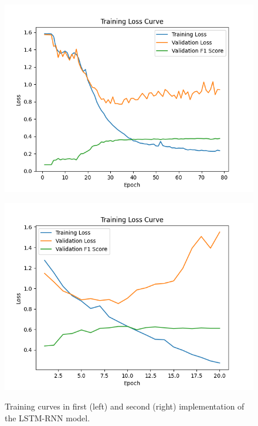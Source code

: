             \begin{figure}[H]
              \centering
              \begin{minipage}{0.48\textwidth}
                \centering
                \includegraphics[width=\textwidth]{images/loss_first.png}
                \label{fig:lstm_training_curve_initial}
              \end{minipage}\hfill
              \begin{minipage}{0.48\textwidth}
                \centering
                \includegraphics[width=\textwidth]{images/loss_second.png}
                \label{fig:lstm_training_curve_meanpool}
              \end{minipage}
              
                \caption{Training curves in first (left) and second (right) implementation of the LSTM-RNN model.}          
            \end{figure}

